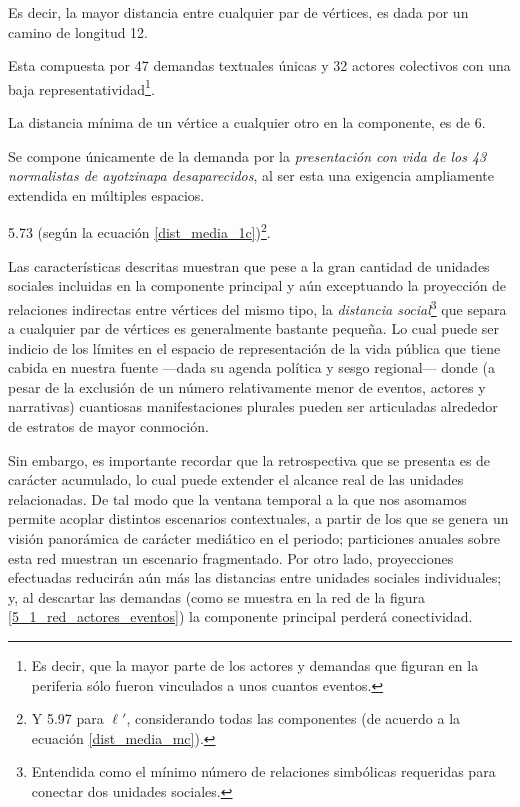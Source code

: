 \documentclass[letterpaper, 11pt]{book}
\theoremstyle{definition}
\theoremstyle{remark}
\begin{document}
\begin{description}
    \setlength\itemsep{0em}
    \item[Diámetro:] Es decir, la mayor distancia entre cualquier par de vértices, es dada por un camino de longitud 12.
    \item[Periferia:] Esta compuesta por 47 demandas textuales únicas y 32 actores colectivos con una baja representatividad\footnote{
	Es decir, que la mayor parte de los actores y demandas que figuran en la periferia sólo fueron vinculados a unos cuantos eventos. 
    }. 
    \item[Radio:] La distancia mínima de un vértice a cualquier otro en la componente, es de 6. 
    \item[Centro:] Se compone únicamente de la demanda por la \emph{presentación con vida de los 43 normalistas de ayotzinapa desaparecidos}, al ser esta una exigencia ampliamente extendida en múltiples espacios. 
    \item[Distancia media entre vértices $\ell$:] 5.73 (según la ecuación \ref{dist_media_1c})\footnote{
	Y 5.97 para $\ell'$, considerando todas las componentes (de acuerdo a la ecuación \ref{dist_media_mc}). 
    }. 
\end{description}



Las características descritas muestran que pese a la gran cantidad de unidades sociales incluidas en la componente principal y aún exceptuando la proyección de relaciones indirectas entre vértices del mismo tipo, la \emph{distancia social}\footnote{
    Entendida como el mínimo número de relaciones simbólicas requeridas para conectar dos unidades sociales. 
} 
que separa a cualquier par de vértices es generalmente bastante pequeña. 
Lo cual puede ser indicio de los límites en el espacio de representación de la vida pública que tiene cabida en nuestra fuente ---dada su agenda política y sesgo regional--- donde (a pesar de la exclusión de un número relativamente menor de eventos, actores y narrativas) cuantiosas manifestaciones plurales pueden ser articuladas alrededor de estratos de mayor conmoción. 


Sin embargo, es importante recordar que la retrospectiva que se presenta es de carácter acumulado, lo cual puede extender el alcance real de las unidades relacionadas. 
De tal modo que la ventana temporal a la que nos asomamos permite acoplar distintos escenarios contextuales, a partir de los que se genera un visión panorámica de carácter mediático en el periodo; particiones anuales sobre esta red muestran un escenario fragmentado. 
Por otro lado, proyecciones efectuadas reducirán aún más las distancias entre unidades sociales individuales; y, al descartar las demandas (como se muestra en la red de la figura \ref{5_1_red_actores_eventos}) la componente principal perderá conectividad. 
\end{document}
